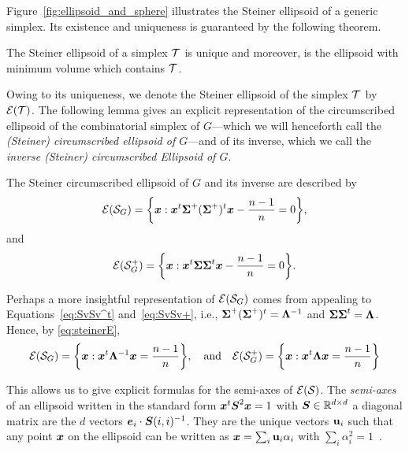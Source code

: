 Figure~\ref{fig:ellipsoid_and_sphere} illustrates  the Steiner ellipsoid of a generic simplex. Its existence  and uniqueness is guaranteed by the following theorem. 

\begin{theorem}
The Steiner ellipsoid of a simplex $\mathcal{T}$ is unique and moreover, is the ellipsoid with minimum volume which contains $\mathcal{T}$. 
\end{theorem}

Owing to its uniqueness, we denote the Steiner ellipsoid of the simplex $\mathcal{T}$ by $\mathcal{E}(\mathcal{T})$. The following lemma gives an explicit representation of the circumscribed ellipsoid of the combinatorial simplex of $G$---which we will  henceforth call the \emph{(Steiner) circumscribed ellipsoid of $G$}---and of its inverse, which we call the \emph{inverse (Steiner) circumscribed Ellipsoid of $G$}. 

\begin{lemma}
	\label{lem:El(S)}
The Steiner circumscribed ellipsoid  of $G$ and its inverse  are described by 
\begin{equation}
\label{eq:steinerE}
    \mathcal{E}(\mathcal{S}_G) = \bigg\{\vb*{x}: \vb*{x}^t \boldsymbol{\Sigma}^+(\boldsymbol{\Sigma}^+)^t \vb*{x} - \frac{n-1}{n}=0\bigg\},
\end{equation}
and 
\begin{equation}
\label{eq:steinerE_inverse}
\mathcal{E}(\mathcal{S}^+_G) = \bigg\{\vb*{x}: \vb*{x}^t \boldsymbol{\Sigma}\boldsymbol{\Sigma}^t \vb*{x} - \frac{n-1}{n}=0\bigg\}.
\end{equation}
\end{lemma}


 Perhaps a more insightful representation of $\mathcal{E}(\mathcal{S}_G)$ comes from appealing to Equations~\eqref{eq:SvSv^t} and~\eqref{eq:SvSv+}, i.e., $\boldsymbol{\Sigma}^+(\boldsymbol{\Sigma}^+)^t = \vb{\Lambda}^{-1}$ and $\boldsymbol{\Sigma}\boldsymbol{\Sigma}^t=\vb{\Lambda}$.  Hence, by \eqref{eq:steinerE},
\begin{equation}
\label{eq:steinerE2}
    \mathcal{E}(\mathcal{S}_G) = \bigg\{\vb*{x}:\vb*{x}^t \vb{\Lambda}^{-1}\vb*{x} = \frac{n-1}{n}\bigg\},\quad\text{and}\quad \mathcal{E}(\mathcal{S}_G^+) = \bigg\{\vb*{x}:\vb*{x}^t \vb{\Lambda}\vb*{x} = \frac{n-1}{n}\bigg\}
\end{equation}

This allows us to give explicit formulas for the semi-axes of $\mathcal{E}(\mathcal{S})$.
 The \emph{semi-axes} of an ellipsoid written in the standard form $\vb*{x}^t \vb*{S}^2\vb*{x}=1$ with $\vb*{S}\in\mathbb{R}^{d\times d}$ a diagonal matrix are the $d$ vectors $\vb*{e}_i\cdot \vb*{S}(i,i)^{-1}$. They are the unique vectors $\vb{u}_i$ such that any  point $\vb*{x}$ on the ellipsoid can be written as $\vb*{x}=\sum_i \vb{u}_i\alpha_i$ with  $\sum_i\alpha_i^2=1$~\cite{devriendt2018simplex}. 
 
